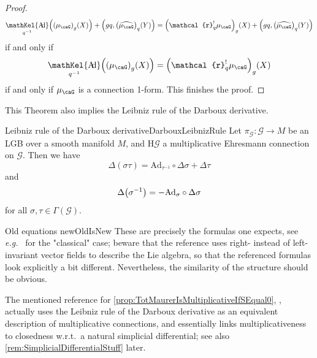 \documentclass[reqno,a4paper,oneside]{amsart}
\newcommand\mutot{\mu_\caG}
\theoremstyle{plain}
\theoremstyle{remark}
\theoremstyle{definition}
\DeclareMathOperator{\sAd}{\mathKel{A\mkern-5.5mu d}}
\begin{document}
\begin{proof}
\begin{equation*}
\sAd_{q^{-1}}\mleft(\mleft(\mutot\mright)_{g}(X)\mright)
		+ \mleft( gq, \mleft( \widehat{\mutot}\mright)_{q} (Y) \mright)
=
\mleft(\mathcal{r}_q^!\mutot\mright)_{g}(X)
		+ \mleft( gq, \mleft( \widehat{\mutot}\mright)_{q} (Y) \mright)
\end{equation*}
if and only if
\begin{equation*}
\sAd_{q^{-1}}\mleft(\mleft(\mutot\mright)_{g}(X)\mright)
=
\mleft(\mathcal{r}_q^!\mutot\mright)_{g}(X)
\end{equation*}
if and only if $\mutot$ is a connection 1-form. This finishes the proof.
%
\end{proof}

This Theorem also implies the Leibniz rule of the Darboux derivative.


\begin{propositions}{Leibniz rule of the Darboux derivative}{DarbouxLeibnizRule}
Let $\pi_{\mathcal{G}} \colon \mathcal{G} \to M$ be an LGB over a smooth manifold $M$, and $\mathrm{H}\mathcal{G}$ a multiplicative Ehresmann connection on $\mathcal{G}$. Then we have
\begin{equation*}
\Delta(\sigma \tau)
=
\mathrm{Ad}_{\tau^{-1}} \circ \Delta \sigma
	+ \Delta\tau
\end{equation*}
and
\begin{equation*}
\Delta\mleft(\sigma^{-1}\mright)
=
- \mathrm{Ad}_{\sigma} \circ \Delta \sigma
\end{equation*}
for all $\sigma, \tau \in \Gamma(\mathcal{G})$.
\end{propositions}

\begin{remarks}{Old equations new}{OldIsNew}
These are precisely the formulas one expects, see \textit{e.g.}\ \cite[\S 5.1, Eq.\ (2) and (3), page 182]{mackenzieGeneralTheory} for the "classical" case; beware that the reference uses right- instead of left-invariant vector fields to describe the Lie algebra, so that the referenced formulas look explicitly a bit different. Nevertheless, the similarity of the structure should be obvious.

The mentioned reference for \ref{prop:TotMaurerIsMultiplicativeIfSEqual0}, \cite[\S 4.4, Lemma 4.14]{LAURENTGENGOUXStienonXuMultiplicativeForms}, actually uses the Leibniz rule of the Darboux derivative as an equivalent description of multiplicative connections, and essentially links multiplicativeness to closedness w.r.t.\ a natural simplicial differential; see also \ref{rem:SimplicialDifferentialStuff} later.
\end{remarks}
\end{document}
